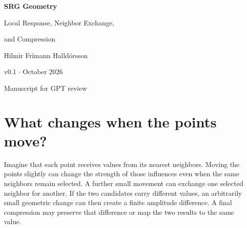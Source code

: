\documentclass[11pt,a4paper]{article}
\theoremstyle{remark}\newtheorem{remark}[theorem]{Remark}
\numberwithin{equation}{section}
\begin{document}
\begin{center}
{\color{ink}\LARGE\bfseries SRG Geometry\par}
\vspace{5pt}
{\Large Local Response, Neighbor Exchange,\par}
{\Large and Compression\par}
\vspace{10pt}
{\large Hilmir Fr\'imann Halld\'orsson\par}
\vspace{4pt}
{\small v0.1 \enspace$\cdot$ October 2026\par}
{\small Manuscript for GPT review\par}
\end{center}

\begin{abstract}
Moving points can change both the strength and the identity of their selected
neighbors. We analyze these two effects on the next amplitudes of the existing
Tower II model at a single fixed pass. A three-particle example gives an exact
response while the selected neighbors remain unchanged. We derive the
normalized-weight differential and a sufficient geometric margin preserving
selection. A seven-particle example isolates one fifth/sixth-neighbor exchange,
and a general jump formula retains the change in the selected enhanced-addition
term. The existing signed compressor preserves differences on a common
unclipped branch and identifies distinct nonzero limits exactly on common
signed plateaus. A fixed rescaling of the seven incoming amplitudes makes
the entire amplitude output constant despite a nonzero precompression jump.
This is not equality of complete moving-particle states. January's accepted
fixed-grid capture cells provide a separate comparison. All claims are
one-pass, conditional, exact-real deductions from unchanged source expressions;
no trajectories, new simulations or claims of physical validation are supplied.
\end{abstract}

\section{What changes when the points move?}\label{sec:question}

Imagine that each point receives values from its nearest neighbors.
Moving the points slightly can change the strength of those influences even
when the same neighbors remain selected. A further small movement can exchange
one selected neighbor for another. If the two candidates carry different
values, an arbitrarily small geometric change can then create a finite
amplitude difference. A final compression may preserve that difference or
map the two results to the same value.
\end{document}
